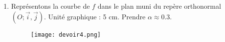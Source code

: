 \documentclass[12pt,a4paper]{article}
\begin{document}
\begin{enumerate}
    
\item Représentons la courbe de $f$ dans le plan muni du repère orthonormal $(O ; \vec{i}, \vec{j})$. Unité graphique : 5 cm. Prendre $\alpha \approx 0.3$.

\begin{figure}[h!]
    \centering
    \texttt{[image: devoir4.png]} %
    \label{fig:courbe_f}
\end{figure}

\end{enumerate}
\end{document}
